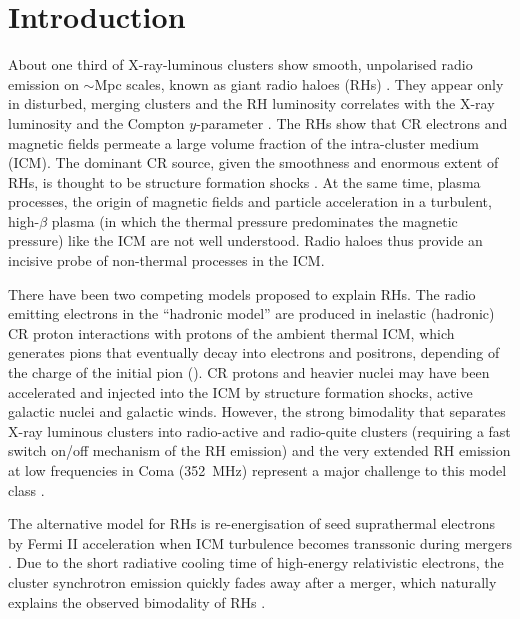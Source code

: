 \documentclass[fleqn,usenatbib,useAMS]{mnras}
\begin{document}
\section{Introduction}
About one third of X-ray-luminous clusters show smooth, unpolarised radio
emission on $\sim$Mpc scales, known as giant radio haloes (RHs)
\citep{2014IJMPD..2330007B}. They appear only in disturbed, merging clusters and
the RH luminosity correlates with the X-ray luminosity
\citep{2001A&A...369..441G,2012A&ARv..20...54F} and the Compton $y$-parameter
\citep{2012MNRAS.421L.112B,2013A&A...554A.140P}. The RHs show that CR electrons
and magnetic fields permeate a large volume fraction of the intra-cluster medium
(ICM). The dominant CR source, given the smoothness and enormous extent of RHs,
is thought to be structure formation shocks \citep{miniati01,pfrommer08}. At the
same time, plasma processes, the origin of magnetic fields and particle
acceleration in a turbulent, high-$\beta$ plasma (in which the thermal pressure
predominates the magnetic pressure) like the ICM are not well understood. Radio
haloes thus provide an incisive probe of non-thermal processes in the ICM.

There have been two competing models proposed to explain RHs.  The
radio emitting electrons in the ``hadronic model'' are produced in
inelastic (hadronic) CR proton interactions with protons of the
ambient thermal ICM, which generates pions that eventually decay into
electrons and positrons, depending of the charge of the initial pion
(\citealp{1980ApJ...239L..93D,1999APh....12..169B,2001ApJ...562..233M,
  2004A&A...413...17P,2008MNRAS.385.1211P,ensslin11}). CR protons and
heavier nuclei may have been accelerated and injected into the ICM by
structure formation shocks, active galactic nuclei and galactic
winds. However, the strong bimodality that separates X-ray luminous
clusters into radio-active and radio-quite clusters (requiring a
fast switch on/off mechanism of the RH emission) and the very extended
RH emission at low frequencies in Coma (352~MHz) represent a major
challenge to this model class \citep{brunetti12,2014MNRAS.438..124Z}.

The alternative model for RHs is re-energisation of seed suprathermal
electrons by Fermi II acceleration when ICM turbulence becomes
transsonic during mergers
\citep{1987A&A...182...21S,1993ApJ...406..399G,2001MNRAS.320..365B,
  2004MNRAS.350.1174B,brunetti07,brunetti11,miniati15}. Due
to the short radiative cooling time of high-energy relativistic
electrons, the cluster synchrotron emission quickly fades away after a
merger, which naturally explains the observed bimodality of RHs
\cite[see e.g.][]{2013MNRAS.429.3564D,2014MNRAS.443.3564D}.
\end{document}
